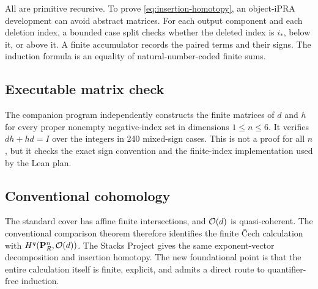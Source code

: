 All are primitive recursive.  To prove \eqref{eq:insertion-homotopy}, an object-iPRA development can
avoid abstract matrices.  For each output component and each deletion index, a bounded case split
checks whether the deleted index is $i_*$, below it, or above it.  A finite accumulator records the
paired terms and their signs.  The induction formula is an equality of natural-number-coded finite
sums.

\subsection{Executable matrix check}

The companion program independently constructs the finite matrices of $d$ and $h$ for every proper
nonempty negative-index set in dimensions $1\leq n\leq6$.  It verifies
$dh+hd=I$ over the integers in 240 mixed-sign cases.  This is not a proof for all $n$, but it checks
the exact sign convention and the finite-index implementation used by the Lean plan.

\subsection{Conventional cohomology}

The standard cover has affine finite intersections, and $\mathcal O(d)$ is quasi-coherent.  The conventional
comparison theorem therefore identifies the finite \v{C}ech calculation with
$H^q(\mathbf P^n_R,\mathcal O(d))$.  The Stacks Project gives the same exponent-vector decomposition and
insertion homotopy.  The new foundational point is that the entire calculation itself is finite,
explicit, and admits a direct route to quantifier-free induction.
